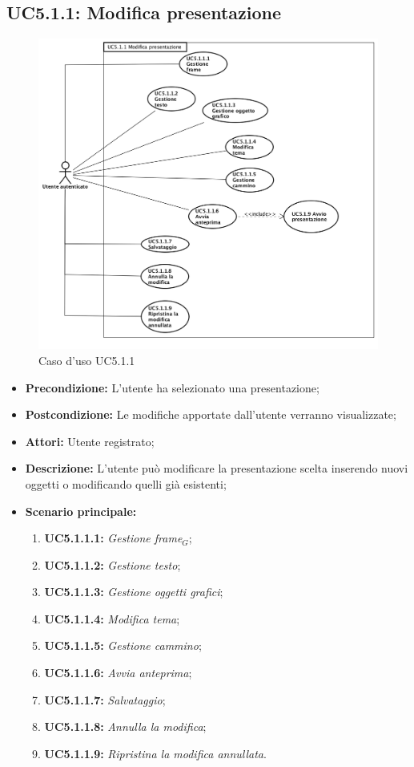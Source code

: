 \subsection{ UC5.1.1: Modifica presentazione}

\begin{figure}[h]
	\begin{center}
	\includegraphics[scale=0.5]{diagram/UC5-1-1.png}
	\caption{Caso d'uso UC5.1.1}
	\end{center}
\end{figure}
\begin{itemize}
	\item \textbf{Precondizione:} L'utente ha selezionato una presentazione;
	\item \textbf{Postcondizione:} Le modifiche apportate dall'utente verranno visualizzate;
	\item \textbf{Attori:} Utente registrato;
	\item \textbf{Descrizione:} L'utente può modificare la presentazione scelta inserendo nuovi oggetti o modificando quelli già esistenti;
	\item \textbf{Scenario principale:}
	\begin{enumerate}
		\item \textbf{ UC5.1.1.1:} \textit{ Gestione frame$_G$};
		\item \textbf{ UC5.1.1.2:} \textit{ Gestione testo};
		\item \textbf{ UC5.1.1.3:} \textit{ Gestione oggetti grafici};
		\item \textbf{ UC5.1.1.4:} \textit{ Modifica tema};
		\item \textbf{ UC5.1.1.5:} \textit{ Gestione cammino};
		\item \textbf{ UC5.1.1.6:} \textit{ Avvia anteprima};
		\item \textbf{ UC5.1.1.7:} \textit{ Salvataggio};
		\item \textbf{ UC5.1.1.8:} \textit{ Annulla la modifica};
		\item \textbf{ UC5.1.1.9:} \textit{ Ripristina la modifica annullata}.
	\end{enumerate}
\end{itemize}
